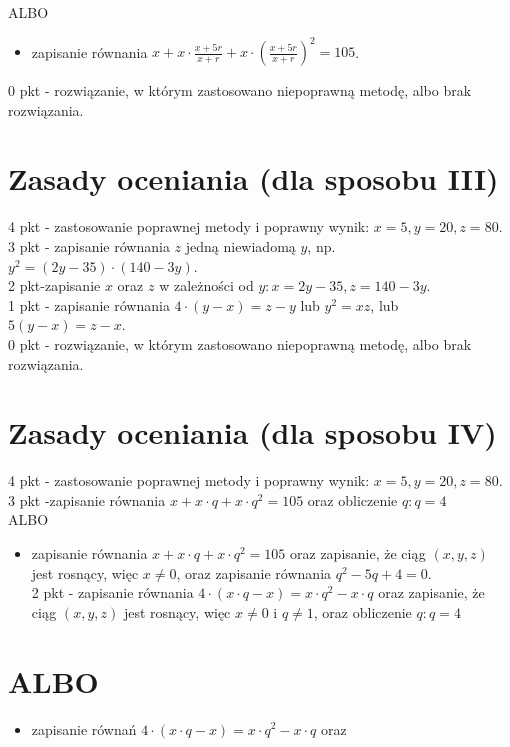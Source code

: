 \documentclass[10pt]{article}
\begin{document}
ALBO

\begin{itemize}
  \item zapisanie równania $x+x \cdot \frac{x+5 r}{x+r}+x \cdot\left(\frac{x+5 r}{x+r}\right)^{2}=105$.
\end{itemize}

0 pkt - rozwiązanie, w którym zastosowano niepoprawną metodę, albo brak rozwiązania.

\section*{Zasady oceniania (dla sposobu III)}
4 pkt - zastosowanie poprawnej metody i poprawny wynik: $x=5, y=20, z=80$.\\
3 pkt - zapisanie równania $z$ jedną niewiadomą $y$, np. $y^{2}=(2 y-35) \cdot(140-3 y)$.\\
2 pkt-zapisanie $x$ oraz $z$ w zależności od $y: x=2 y-35, z=140-3 y$.\\
1 pkt - zapisanie równania $4 \cdot(y-x)=z-y$ lub $y^{2}=x z$, lub $5(y-x)=z-x$.\\
0 pkt - rozwiązanie, w którym zastosowano niepoprawną metodę, albo brak rozwiązania.

\section*{Zasady oceniania (dla sposobu IV)}
4 pkt - zastosowanie poprawnej metody i poprawny wynik: $x=5, y=20, z=80$.\\
3 pkt -zapisanie równania $x+x \cdot q+x \cdot q^{2}=105$ oraz obliczenie $q: q=4$\\
ALBO

\begin{itemize}
  \item zapisanie równania $x+x \cdot q+x \cdot q^{2}=105$ oraz zapisanie, że ciąg $(x, y, z)$ jest rosnący, więc $x \neq 0$, oraz zapisanie równania $q^{2}-5 q+4=0$.\\
2 pkt - zapisanie równania $4 \cdot(x \cdot q-x)=x \cdot q^{2}-x \cdot q$ oraz zapisanie, że ciąg $(x, y, z)$ jest rosnący, więc $x \neq 0$ i $q \neq 1$, oraz obliczenie $q: q=4$
\end{itemize}

\section*{ALBO}
\begin{itemize}
  \item zapisanie równań $4 \cdot(x \cdot q-x)=x \cdot q^{2}-x \cdot q$ oraz
\end{itemize}
\end{document}
